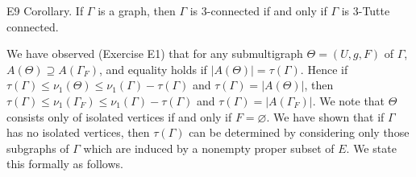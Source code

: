 E9 Corollary. If $\Gamma$ is a graph, then $\Gamma$ is 3-connected if and only if $\Gamma$ is 3-Tutte connected.

We have observed (Exercise E1) that for any submultigraph $\Theta = (U, g, F)$ of $\Gamma$, $A(\Theta) \supseteq A(\Gamma_F)$, and equality holds if $|A(\Theta)| = \tau(\Gamma)$. Hence if $\tau(\Gamma) \leq \nu_1(\Theta) \leq \nu_1(\Gamma) - \tau(\Gamma)$ and $\tau(\Gamma) = |A(\Theta)|$, then $\tau(\Gamma) \leq \nu_1(\Gamma_F) \leq \nu_1(\Gamma) - \tau(\Gamma)$ and $\tau(\Gamma) = |A(\Gamma_F)|$. We note that $\Theta$ consists only of isolated vertices if and only if $F = \varnothing$. We have shown that if $\Gamma$ has no isolated vertices, then $\tau(\Gamma)$ can be determined by considering only those subgraphs of $\Gamma$ which are induced by a nonempty proper subset of $E$. We state this formally as follows.
